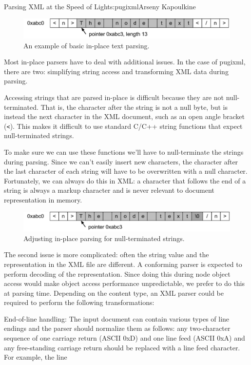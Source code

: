 \begin{aosachapter}{Parsing XML at the Speed of Light}{s:pugixml}{Arseny Kapoulkine}
\begin{figure}[htbp]
\centering
\includegraphics{pugixml-images/image01.png}
\caption{An example of basic in-place text parsing.}
\end{figure}

Most in-place parsers have to deal with additional issues. In the case
of pugixml, there are two: simplifying string access and transforming
XML data during parsing.

Accessing strings that are parsed in-place is difficult because they are
not null-terminated. That is, the character after the string is not a
null byte, but is instead the next character in the XML document, such
as an open angle bracket (\texttt{\textless{}}). This makes it difficult
to use standard C/C++ string functions that expect null-terminated
strings.

To make sure we can use these functions we'll have to null-terminate the
strings during parsing. Since we can't easily insert new characters, the
character after the last character of each string will have to be
overwritten with a null character. Fortunately, we can always do this in
XML: a character that follows the end of a string is always a markup
character and is never relevant to document representation in memory.

\begin{figure}[htbp]
\centering
\includegraphics{pugixml-images/image03.png}
\caption{Adjusting in-place parsing for null-terminated strings.}
\end{figure}

The second issue is more complicated: often the string value and the
representation in the XML file are different. A conforming parser is
expected to perform decoding of the representation. Since doing this
during node object access would make object access performance
unpredictable, we prefer to do this at parsing time. Depending on the
content type, an XML parser could be required to perform the following
transformations:

\begin{aosaitemize}
\item
  End-of-line handling: The input document can contain various types of
  line endings and the parser should normalize them as follows: any
  two-character sequence of one carriage return (ASCII 0xD) and one line
  feed (ASCII 0xA) and any free-standing carriage return should be
  replaced with a line feed character. For example, the line


\end{aosaitemize}
\end{aosachapter}
